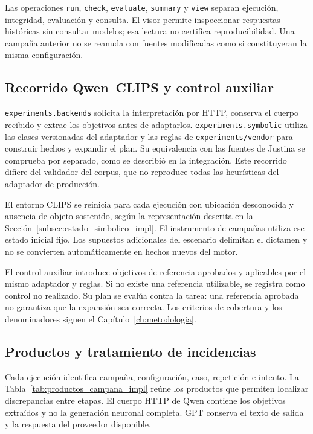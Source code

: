 Las operaciones \texttt{run}, \texttt{check}, \texttt{evaluate},
\texttt{summary} y \texttt{view} separan ejecución, integridad,
evaluación y consulta. El visor permite inspeccionar respuestas históricas
sin consultar modelos; esa lectura no certifica reproducibilidad.
Una campaña anterior no se reanuda con fuentes modificadas como si
constituyeran la misma configuración.

\subsection{Recorrido Qwen--CLIPS y control auxiliar}

\texttt{experiments.\allowbreak backends} solicita la interpretación por HTTP,
conserva el cuerpo recibido y extrae los objetivos antes de adaptarlos.
\texttt{experiments.\allowbreak symbolic} utiliza las clases versionadas del
adaptador y las reglas de \texttt{experiments/\allowbreak vendor} para construir
hechos y expandir el plan. Su equivalencia con las fuentes de Justina
se comprueba por separado, como se describió en la integración.
Este recorrido difiere del validador del corpus, que no reproduce todas
las heurísticas del adaptador de producción.

El entorno CLIPS se reinicia para cada ejecución con ubicación desconocida
y ausencia de objeto sostenido, según la representación descrita en la
Sección~\ref{subsec:estado_simbolico_impl}. El instrumento de campañas
utiliza ese estado inicial fijo. Los supuestos adicionales del
escenario delimitan el dictamen y no se convierten automáticamente en
hechos nuevos del motor.

El control auxiliar introduce objetivos de referencia aprobados y
aplicables por el mismo adaptador y reglas. Si no existe una referencia
utilizable, se registra como control no realizado. Su plan se evalúa
contra la tarea: una referencia aprobada no garantiza que la expansión
sea correcta. Los criterios de cobertura y los denominadores siguen el
Capítulo~\ref{ch:metodologia}.

\subsection{Productos y tratamiento de incidencias}

Cada ejecución identifica campaña, configuración, caso, repetición e
intento. La Tabla~\ref{tab:productos_campana_impl} reúne los productos
que permiten localizar discrepancias entre etapas. El cuerpo HTTP de
Qwen contiene los objetivos extraídos y no la generación neuronal completa.
GPT conserva el texto de salida y la respuesta del proveedor disponible.

